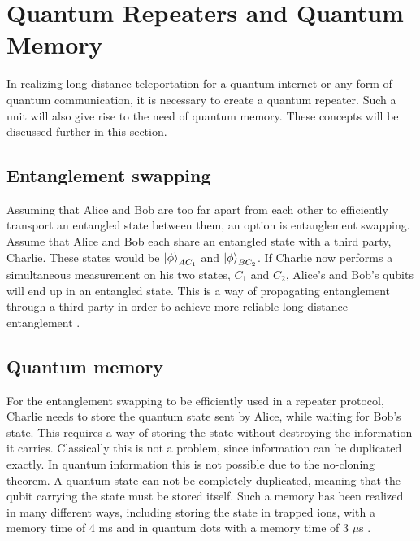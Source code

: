 \section{Quantum Repeaters and Quantum Memory}
In realizing long distance teleportation for a quantum internet or any form of quantum communication, it is necessary to create a quantum repeater. Such a unit will also give rise to the need of quantum memory. These concepts will be discussed further in this section.

\subsection{Entanglement swapping}

Assuming that Alice and Bob are too far apart from each other to efficiently transport an entangled state between them, an option is entanglement swapping. Assume that Alice and Bob each share an entangled state with a third party, Charlie. These states would be $\ket{\phi}_{AC_1}$ and $\ket{\phi}_{BC_2}$. If Charlie now performs a simultaneous measurement on his two states, $C_1$ and $C_2$, Alice's and Bob's qubits will end up in an entangled state. This is a way of propagating entanglement through a third party in order to achieve more reliable long distance entanglement \cite{Azuma:2023}.

\subsection{Quantum memory}

For the entanglement swapping to be efficiently used in a repeater protocol, Charlie needs to store the quantum state sent by Alice, while waiting for Bob's state. This requires a way of storing the state without destroying the information it carries. Classically this is not a problem, since information can be duplicated exactly. In quantum information this is not possible due to the no-cloning theorem. A quantum state can not be completely duplicated, meaning that the qubit carrying the state must be stored itself. Such a memory has been realized in many different ways, including storing the state in trapped ions, with a memory time of 4 ms \cite{trapped_ion_memory} and in quantum dots with a memory time of 3 $\mu$s \cite{dot_memory}.


